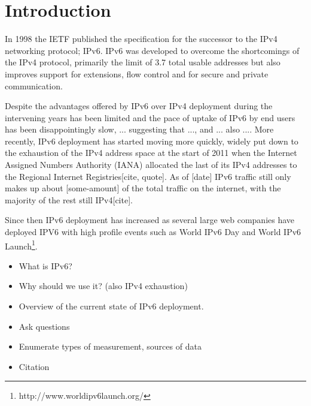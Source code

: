 \section{Introduction}

In 1998 the IETF published the specification for the successor to the IPv4
networking protocol; IPv6. IPv6 was developed to overcome the shortcomings
of the IPv4 protocol, primarily the limit of 3.7 total usable
addresses\cite{beijnum_ip} but also improves support for extensions, flow
control and for secure and private communication\cite{rfc2460}.

Despite the advantages offered by IPv6 over IPv4 deployment during the
intervening years has been limited and the pace of
uptake of IPv6 by end users has been disappointingly slow,  
... suggesting that ..., and ... also .... More
recently, IPv6 deployment has started moving more quickly, widely put down to
the exhaustion of the IPv4 address space at the start of 2011 when the Internet
Assigned Numbers Authority (IANA) allocated the last of its IPv4 addresses to
the Regional Internet Registries[cite, quote]. As of [date] IPv6 traffic still only makes up
about [some-amount] of the total traffic on the internet, with the majority of
the rest still IPv4[cite].




Since then IPv6 deployment has increased as several large web companies have
deployed IPV6 with high profile events such as World IPv6
Day and World IPv6 Launch\footnote[2]{http://www.worldipv6launch.org/}.


\begin{itemize}
    \item What is IPv6?
    \item Why should we use it? (also IPv4 exhaustion)
    \item Overview of the current state of IPv6 deployment.
    \item Ask questions
    \item Enumerate types of measurement, sources of data
    \item Citation\cite{rfc3177}
\end{itemize}
